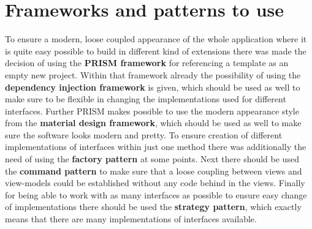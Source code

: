 	\section{Frameworks and patterns to use}
To ensure a modern, loose coupled appearance of the whole application where it is quite easy possible to build in different kind of extensions there was made the decision of using the \textbf{PRISM framework} for referencing a template as an empty new project. Within that framework already the possibility of using the \textbf{dependency injection framework} is given, which should be used as well to make sure to be flexible in changing the implementations used for different interfaces. Further PRISM makes possible to use the modern appearance style from the \textbf{material design framework}, which should be used as well to make sure the software looks modern and pretty. To ensure creation of different implementations of interfaces within just one method there was additionally the need of using the \textbf{factory pattern} at some points.\cite{JAXenter.2012} Next there should be used the \textbf{command pattern} to make sure that a loose coupling between views and view-models could be established without any code behind in the views. Finally for being able to work with as many interfaces as possible to ensure easy change of implementations there should be used the \textbf{strategy pattern}, which exactly means that there are many implementations of interfaces available.\cite{Wikipedia.2021d}
